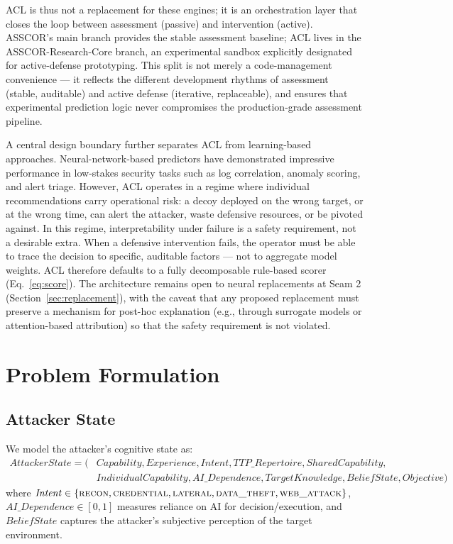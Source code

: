 \documentclass[preprints,article,accept,oneauthor]{Definitions/mdpi}
\newcommand{\intent}[1]{\textsc{#1}}
\begin{document}
ACL is thus not a replacement for these engines; it is an orchestration layer that closes the loop between assessment (passive) and intervention (active). ASSCOR's main branch provides the stable assessment baseline; ACL lives in the ASSCOR-Research-Core branch, an experimental sandbox explicitly designated for active-defense prototyping. This split is not merely a code-management convenience --- it reflects the different development rhythms of assessment (stable, auditable) and active defense (iterative, replaceable), and ensures that experimental prediction logic never compromises the production-grade assessment pipeline.

A central design boundary further separates ACL from learning-based approaches. Neural-network-based predictors have demonstrated impressive performance in low-stakes security tasks such as log correlation, anomaly scoring, and alert triage. However, ACL operates in a regime where individual recommendations carry operational risk: a decoy deployed on the wrong target, or at the wrong time, can alert the attacker, waste defensive resources, or be pivoted against. In this regime, interpretability under failure is a safety requirement, not a desirable extra. When a defensive intervention fails, the operator must be able to trace the decision to specific, auditable factors --- not to aggregate model weights. ACL therefore defaults to a fully decomposable rule-based scorer (Eq.~\ref{eq:score}). The architecture remains open to neural replacements at Seam 2 (Section~\ref{sec:replacement}), with the caveat that any proposed replacement must preserve a mechanism for post-hoc explanation (e.g., through surrogate models or attention-based attribution) so that the safety requirement is not violated.

\section{Problem Formulation}
\label{sec:problem}

\subsection{Attacker State}
\label{sec:state}

We model the attacker's cognitive state as:
\[
\begin{aligned}
\mathit{AttackerState} = (&\mathit{Capability},\mathit{Experience},\mathit{Intent},
\mathit{TTP\_Repertoire},\mathit{SharedCapability},\\
&\mathit{IndividualCapability},\mathit{AI\_Dependence},\mathit{TargetKnowledge},
\mathit{BeliefState},\mathit{Objective})
\end{aligned}
\]
where $\mathit{Intent} \in \{\intent{recon}, \intent{credential},
\intent{lateral}, \intent{data\_theft}, \intent{web\_attack}\}$,
$\mathit{AI\_Dependence} \in [0,1]$ measures reliance on AI for
decision/execution, and $\mathit{BeliefState}$ captures the attacker's
subjective perception of the target environment.
\end{document}
